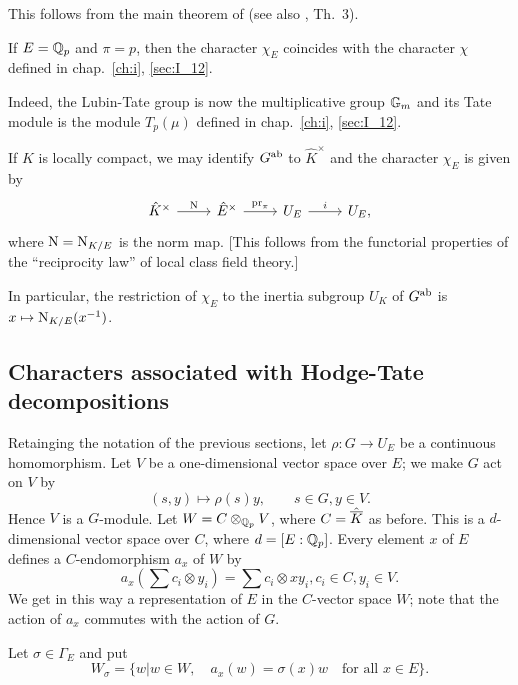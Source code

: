 \begin{subappendices}
This follows from the main theorem of \cite{17} (see also \cite[149]{6}, Th.~3).
\dpage

\begin{corp}
If $E = \mathbb{Q}_p$ and $\pi = p$, then the character $\chi_E$ coincides with the
character $\chi$ defined in chap.~\ref{ch:i}, \ref{sec:I_12}. 
\end{corp}

Indeed, the Lubin-Tate group is now the multiplicative group $\mathbb{G}_m$
and its Tate module is the module $T_p(\mu)$ defined in chap.~\ref{ch:i},
\ref{sec:I_12}.

\begin{obs}
If $K$ is locally compact, we may identify $G^{\mathrm{ab}}$ to $\hat{K}^\times$ and
the character $\chi_E$ is given by
\[\begin{tikzcd}
	\hat{K}^\times \rar["{\Nm}"] & \hat{E}^\times \rar["\pr_\pi"] & U_E
	\rar["i"] & U_E,
\end{tikzcd}\]
where $\operatorname{N} = \operatorname{N}_{K/E}$ is the norm map. [This follows from the functorial
properties of the ``reciprocity law'' of local class field theory.]

In particular, the restriction of $\chi_E$ to the inertia subgroup $U_K$ of
$G^{\mathrm{ab}}$ is $x \mapsto \operatorname{N}_{K/E}(x^{-1})$.
\end{obs}

\subsection{Characters associated with Hodge-Tate decompositions}
\label{sec:III_A5}

Retainging the notation of the previous sections, let $\rho \colon G \to U_E$ be
a continuous homomorphism. Let $V$ be a one-dimensional vector space over $E$;
we make $G$ act on $V$ by
\[
	(s,y) \mapsto \rho(s)y, \qquad s \in G, y \in V.
\]
Hence $V$ is a $G$-module. Let $W = C \otimes_{\mathbb{Q}_p} V$, where $C =
\hat{\overline{K}}$ as before.
\dpage
This is a $d$-dimensional vector space over $C$,
where $d = [E : \mathbb{Q}_p]$. Every element $x$ of
$E$ defines a $C$-endomorphism $a_x$ of $W$ by
\[
	a_x(\sum c_i \otimes y_i) = \sum c_i \otimes xy_i, c_i \in C, y_i \in V.
\]
We get in this way a representation of $E$ in the $C$-vector space $W$; note
that the action of $a_x$ commutes with the action of $G$. 

Let $\sigma \in \Gamma_E$ and put
\[
	W_\sigma = \{ w | w \in  W, \quad a_x(w) = \sigma(x) w \quad \text{for
all } x \in E\}.
\]


\end{subappendices}
